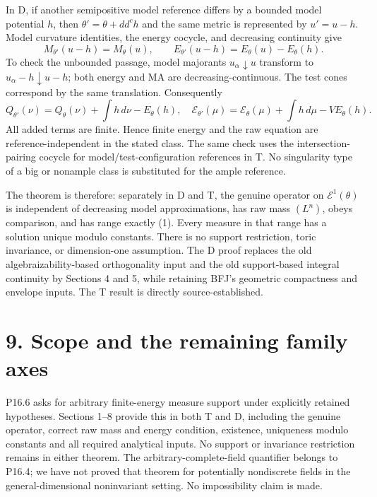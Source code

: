 \documentclass[11pt]{article}
\begin{document}
In D, if another semipositive model reference differs by a bounded model potential \(h\), then \(\theta'=\theta+dd^ch\) and the same metric is represented by \(u'=u-h\). Model curvature identities, the energy cocycle, and decreasing continuity give
\[
 M_{\theta'}(u-h)=M_\theta(u),\qquad
 E_{\theta'}(u-h)=E_\theta(u)-E_\theta(h).
 \tag{18}
\]
To check the unbounded passage, model majorants \(u_\alpha\downarrow u\) transform to \(u_\alpha-h\downarrow u-h\); both energy and MA are decreasing-continuous. The test cones correspond by the same translation. Consequently
\[
 Q_{\theta'}(\nu)=Q_\theta(\nu)+\int h\,d\nu-E_\theta(h),
 \quad
 \mathscr E_{\theta'}(\mu)=\mathscr E_\theta(\mu)+\int h\,d\mu-VE_\theta(h).
 \tag{19}
\]
All added terms are finite. Hence finite energy and the raw equation are reference-independent in the stated class. The same check uses the intersection-pairing cocycle for model/test-configuration references in T. No singularity type of a big or nonample class is substituted for the ample reference.

The theorem is therefore: separately in D and T, the genuine operator on \(\mathcal E^1(\theta)\) is independent of decreasing model approximations, has raw mass \((L^n)\), obeys comparison, and has range exactly (1). Every measure in that range has a solution unique modulo constants. There is no support restriction, toric invariance, or dimension-one assumption. The D proof replaces the old algebraizability-based orthogonality input and the old support-based integral continuity by Sections 4 and 5, while retaining BFJ's geometric compactness and envelope inputs. The T result is directly source-established.

\section*{9. Scope and the remaining family axes}

P16.6 asks for arbitrary finite-energy measure support under explicitly
retained hypotheses. Sections 1--8 provide this in both T and D,
including the genuine operator, correct raw mass and energy condition,
existence, uniqueness modulo constants and all required analytical
inputs. No support or invariance restriction remains in either
theorem. The arbitrary-complete-field quantifier belongs to P16.4;
we have not proved that theorem for potentially nondiscrete fields in
the general-dimensional noninvariant setting. No impossibility claim is
made.
\end{document}
